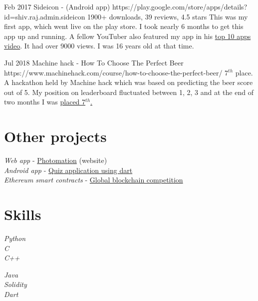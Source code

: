 \documentclass[10pt]{article} %
\begin{document}
\job
{Feb 2017}{}
{Sideicon - (Android app)}
{https://play.google.com/store/apps/details?id=shiv.raj.admin.sideicon}
{1900+ downloads, 39 reviews, 4.5 stars}
{This was my first app, which went live on the play store. I took nearly 6 months to get this app up and running. A fellow YouTuber also featured my app in his \href{https://youtu.be/2xnldqbf5Nc?t=137}{top 10 apps video}. It had over 9000 views. I was 16 years old at that time.}

\job
{Jul 2018}{}
{Machine hack - How To Choose The Perfect Beer}
{https://www.machinehack.com/course/how-to-choose-the-perfect-beer/}
{7$^{th}$ place.}
{A hackathon held by Machine hack which was based on predicting the beer score out of 5. My position on leaderboard fluctuated between 1, 2, 3 and at the end of two months I was \href{https://www.machinehack.com/course/how-to-choose-the-perfect-beer/leaderboard}{placed 7$^{th}$.}}


\section{Other projects}
{
	\textit{Web app} - \href{https://github.com/sbh69840/photo-mation}{Photomation} (website)\\
	\textit{Android app} - \href{https://github.com/sbh69840/interview}{Quiz application using dart}\\
	\textit{Ethereum smart contracts} - \href{https://github.com/sbh69840/CompanyBlockchain}{Global blockchain competition}\\
	
}

\section{Skills}

{
	
\textit{Python}\\
\textit{C}\\
\textit{C++}\\
}
{
	
	\textit{Java}\\
	\textit{Solidity}\\
	\textit{Dart}\\
}
\end{document}
